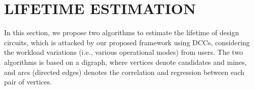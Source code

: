 \section{LIFETIME ESTIMATION}
\begin{comment}
\begin{figure*}[!ht]
    \centering
    \subfigure{
    	\label{fig:sub:alg1}
        \texttt{[image: algorithm1.png]}
    }
    \hspace{1.6cm}
    \subfigure{
    	\label{fig:sub:alg2}
        \texttt{[image: algorithm2.png]}
    }
    \caption{Algorithms used to estimate lifetime of designs}
    \label{fig:en}
\end{figure*}
\end{comment}
In this section, we propose two algorithms to estimate the lifetime of design circuits, which is attacked by our proposed framework using DCCs, considering the workload variations (i.e., various operational modes) from users. The two algorithms is based on a digraph, where vertices denote candidates and mines, and arcs (directed edges) denotes the correlation and regression between each pair of vertices.


